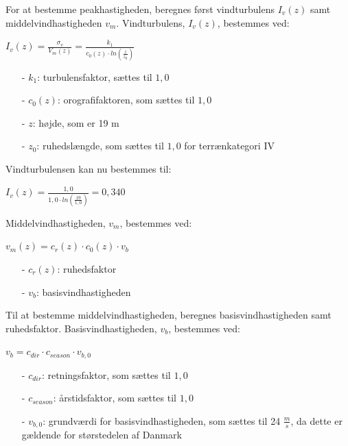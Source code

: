 For at bestemme peakhastigheden, beregnes først vindturbulens $I_v(z)$ samt middelvindhastigheden $v_m$.
\newline
\newline
Vindturbulens, $I_v(z)$, bestemmes ved:
\begin{center}
$I_v(z)=\frac{\sigma_v}{V_m(z)}=\frac{k_1}{c_0(z)\cdot ln(\frac{z}{z_0})}$
\end{center}
\begin{itemize}
	\item[-] $k_1$: turbulensfaktor, sættes til $1,\!0$ \citep[ kapitel 4.4]{EU91}
	\item[-] $c_0(z)$: orografifaktoren, som sættes til $1,\!0$ \citep[ kapitel 4.3.1]{EU91}
	\item[-] $z$: højde, som er 19 m
	\item[-] $z_0$: ruhedslængde, som sættes til $1,\!0$ for terrænkategori IV \citep[ tabel 4.1 kapitel 4.3.2]{EU91}
\end{itemize}
Vindturbulensen kan nu bestemmes til:
\begin{center}
$I_v(z)=\frac{1,\!0}{1,\!0\cdot ln(\frac{19}{1,\!0})}=0,\!340$
\end{center}
Middelvindhastigheden, $v_m$, bestemmes ved:
\begin{center}
$v_m(z)=c_r(z)\cdot c_0(z)\cdot v_b$
\end{center}
\begin{itemize}
	\item[-] $c_r(z)$: ruhedsfaktor
	\item[-] $v_b$: basisvindhastigheden
\end{itemize}
Til at bestemme middelvindhastigheden, beregnes basisvindhastigheden samt ruhedsfaktor.
\newline
\newline
Basisvindhastigheden, $v_b$, bestemmes ved:
\begin{center}
$v_b=c_{dir}\cdot c_{season}\cdot v_{b,0}$
\end{center}
\begin{itemize}
	\item[-] $c_{dir}$: retningsfaktor, som sættes til $1,\!0$ \citep[ tabel 1a kapitel 4.2]{EU91}
	\item[-] $c_{season}$: årstidsfaktor, som sættes til $1,\!0$ \citep[ tabel 1b kapitel 4.2]{EU91}
	\item[-] $v_{b,0}$: grundværdi for basisvindhastigheden, som sættes til 24 $\frac{m}{s}$, da dette er gældende for størstedelen af Danmark \citep[ kapitel 4.2]{EU91}
\end{itemize}

